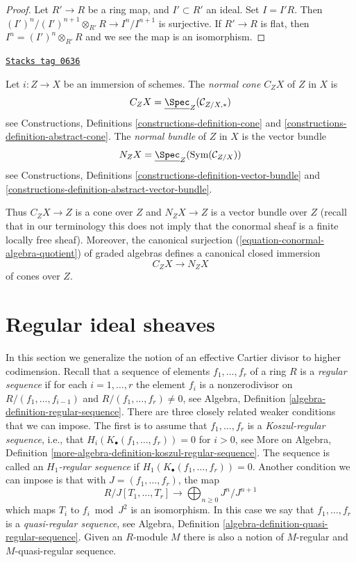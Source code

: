 \begin{proof}
Let $R' \to R$ be a ring map, and $I' \subset R'$ an ideal.
Set $I = I'R$. Then $(I')^n/(I')^{n + 1} \otimes_{R'} R \to I^n/I^{n + 1}$
is surjective. If $R' \to R$ is flat, then $I^n = (I')^n \otimes_{R'} R$
and we see the map is an isomorphism.
\end{proof}

\begin{definition}
\label{divisors-definition-normal-cone}
\href{https://stacks.math.columbia.edu/tag/0636}{\texttt{Stacks tag 0636}}

Let $i : Z \to X$ be an immersion of schemes.
The {\it normal cone $C_ZX$} of $Z$ in $X$ is
$$
C_ZX = \underline{\Spec}_Z(\mathcal{C}_{Z/X, *})
$$
see
Constructions,
Definitions \ref{constructions-definition-cone} and
\ref{constructions-definition-abstract-cone}. The {\it normal bundle}
of $Z$ in $X$ is the vector bundle
$$
N_ZX = \underline{\Spec}_Z(\text{Sym}(\mathcal{C}_{Z/X}))
$$
see
Constructions,
Definitions \ref{constructions-definition-vector-bundle} and
\ref{constructions-definition-abstract-vector-bundle}.
\end{definition}

Thus $C_ZX \to Z$ is a cone over $Z$ and $N_ZX \to Z$ is a vector bundle
over $Z$ (recall that in our terminology this does not imply that
the conormal sheaf is a finite locally free sheaf). Moreover, the canonical
surjection (\ref{equation-conormal-algebra-quotient}) of graded algebras
defines a canonical closed immersion
\begin{equation}
\label{equation-normal-cone-in-normal-bundle}
C_ZX \longrightarrow N_ZX
\end{equation}
of cones over $Z$.

\section{Regular ideal sheaves}
\label{divisors-section-regular-ideal-sheaves}
In this section we generalize the notion of an effective Cartier divisor
to higher codimension. Recall that a sequence of elements
$f_1, \ldots, f_r$ of a ring $R$ is a {\it regular sequence} if for each
$i = 1, \ldots, r$ the element $f_i$ is a nonzerodivisor on
$R/(f_1, \ldots, f_{i - 1})$ and $R/(f_1, \ldots, f_r) \not = 0$, see
Algebra, Definition \ref{algebra-definition-regular-sequence}.
There are three closely related weaker conditions that we can impose.
The first is to assume that $f_1, \ldots, f_r$ is a {\it Koszul-regular
sequence}, i.e., that $H_i(K_\bullet(f_1, \ldots, f_r)) = 0$ for $i > 0$, see
More on Algebra,
Definition \ref{more-algebra-definition-koszul-regular-sequence}.
The sequence is called an {\it $H_1$-regular sequence} if
$H_1(K_\bullet(f_1, \ldots, f_r)) = 0$. Another condition we can impose
is that with $J = (f_1, \ldots, f_r)$, the map
$$
R/J[T_1, \ldots, T_r]
\longrightarrow
\bigoplus\nolimits_{n \geq 0}
J^n/J^{n + 1}
$$
which maps $T_i$ to $f_i \bmod J^2$ is an isomorphism. In this case
we say that $f_1, \ldots, f_r$ is a
{\it quasi-regular sequence}, see
Algebra, Definition \ref{algebra-definition-quasi-regular-sequence}.
Given an $R$-module $M$ there is also a notion of $M$-regular and
$M$-quasi-regular sequence.

